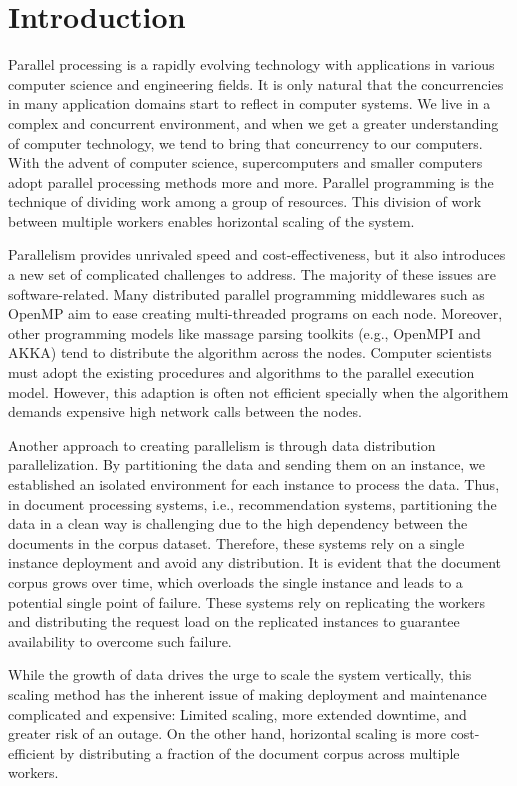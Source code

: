 \chapter{Introduction}

Parallel processing is a rapidly evolving technology with applications in various computer science and engineering fields. It is only natural that the concurrencies in many application domains start to reflect in computer systems. We live in a complex and concurrent environment, and when we get a greater understanding of computer technology, we tend to bring that concurrency to our computers. With the advent of computer science, supercomputers and smaller computers adopt parallel processing methods more and more. Parallel programming is the technique of dividing work among a group of resources. This division of work between multiple workers enables horizontal scaling of the system. 


Parallelism provides unrivaled speed and cost-effectiveness, but it also introduces a new set of complicated challenges to address. The majority of these issues are software-related. Many distributed parallel programming middlewares such as OpenMP aim to ease creating multi-threaded programs on each node. Moreover, other programming models like massage parsing toolkits (e.g., OpenMPI and AKKA) tend to distribute the algorithm across the nodes. Computer scientists must adopt the existing procedures and algorithms to the parallel execution model. However, this adaption is often not efficient specially when the algorithem demands expensive high network calls between the nodes.


Another approach to creating parallelism is through data distribution parallelization. By partitioning the data and sending them on an instance, we established an isolated environment for each instance to process the data. Thus, in document processing systems, i.e., recommendation systems, partitioning the data in a clean way is challenging due to the high dependency between the documents in the corpus dataset. Therefore, these systems rely on a single instance deployment and avoid any distribution. It is evident that the document corpus grows over time, which overloads the single instance and leads to a potential single point of failure. These systems rely on replicating the workers and distributing the request load on the replicated instances to guarantee availability to overcome such failure.


While the growth of data drives the urge to scale the system vertically, this scaling method has the inherent issue of making deployment and maintenance complicated and expensive: Limited scaling, more extended downtime, and greater risk of an outage. On the other hand, horizontal scaling is more cost-efficient by distributing a fraction of the document corpus across multiple workers.


